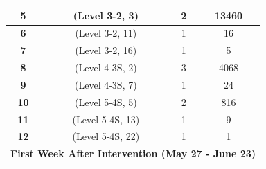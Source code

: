 \begin{table}
\begin{tabular}{cccc}
\textbf{5}              & (Level 3-2, 3)                                                                      & 2                                                                           & 13460                                                                          \\ \hline
\textbf{6}              & (Level 3-2, 11)                                                                     & 1                                                                           & 16                                                                             \\ \hline
\textbf{7}              & (Level 3-2, 16)                                                                     & 1                                                                           & 5                                                                              \\ \hline
\textbf{8}              & (Level 4-3S, 2)                                                                      & 3                                                                           & 4068                                                                           \\ \hline
\textbf{9}              & (Level 4-3S, 7)                                                                      & 1                                                                           & 24                                                                             \\ \hline
\textbf{10}             & (Level 5-4S, 5)                                                                      & 2                                                                           & 816                                                                            \\ \hline
\textbf{11}             & (Level 5-4S, 13)                                                                     & 1                                                                           & 9                                                                              \\ \hline
\textbf{12}             & (Level 5-4S, 22)                                                                     & 1                                                                           & 1                                                                              \\ \hline
\multicolumn{4}{c}{\cellcolor[HTML]{ECF4FF}\textbf{First Week After Intervention (May 27 - June 23)}}                                                                                                                                                               \\ \hline

\end{tabular}
\end{table}
